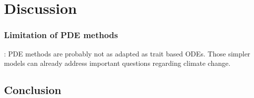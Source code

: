 %
\chapter{Discussion}
\label{sec:conclusion}

\subsection{Limitation of PDE methods}
\cite{Akesson2021} : PDE methods are probably not as adapted as trait based ODEs. Those simpler models can already address important questions regarding climate change.

\section{Conclusion}